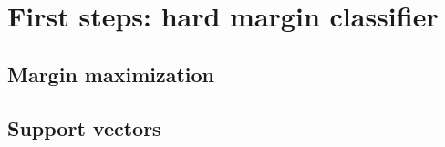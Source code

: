 \section {First steps: hard margin classifier}

\subsection {Margin maximization}
\subsection {Support vectors}